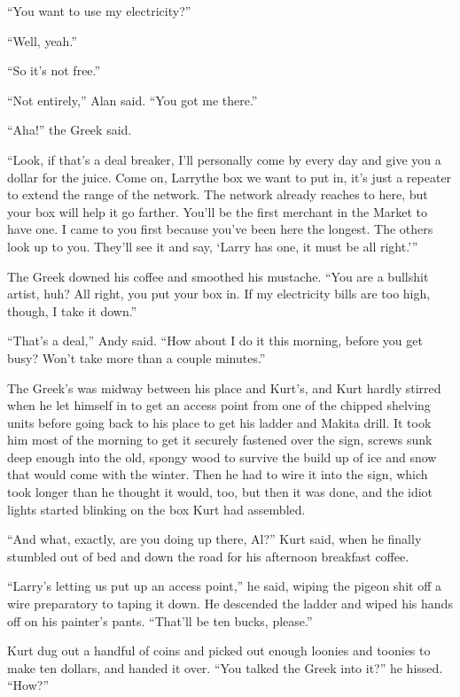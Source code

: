 ``You want to use my electricity?''

``Well, yeah.''

``So it's not free.''

``Not entirely,'' Alan said.  ``You got me there.''

``Aha!'' the Greek said.

``Look, if that's a deal breaker, I'll personally come by every day
and give you a dollar for the juice.  Come on, Larry\dash{}the box we want
to put in, it's just a repeater to extend the range of the network. 
The network already reaches to here, but your box will help it go
farther.  You'll be the first merchant in the Market to have one.  I
came to you first because you've been here the longest.  The others
look up to you.  They'll see it and say, `Larry has one, it must be
all right.'''

The Greek downed his coffee and smoothed his mustache.  ``You are a
bullshit artist, huh?  All right, you put your box in.  If my
electricity bills are too high, though, I take it down.''

``That's a deal,'' Andy said.  ``How about I do it this morning,
before you get busy?  Won't take more than a couple minutes.''

The Greek's was midway between his place and Kurt's, and Kurt hardly
stirred when he let himself in to get an access point from one of the
chipped shelving units before going back to his place to get his
ladder and Makita drill.  It took him most of the morning to get it
securely fastened over the sign, screws sunk deep enough into the old,
spongy wood to survive the build up of ice and snow that would come
with the winter.  Then he had to wire it into the sign, which took
longer than he thought it would, too, but then it was done, and the
idiot lights started blinking on the box Kurt had assembled.

``And what, exactly, are you doing up there, Al?'' Kurt said, when he
finally stumbled out of bed and down the road for his afternoon
breakfast coffee.

``Larry's letting us put up an access point,'' he said, wiping the
pigeon shit off a wire preparatory to taping it down.  He descended
the ladder and wiped his hands off on his painter's pants.  ``That'll
be ten bucks, please.''

Kurt dug out a handful of coins and picked out enough loonies and
toonies to make ten dollars, and handed it over.  ``You talked the
Greek into it?'' he hissed.  ``How?''

